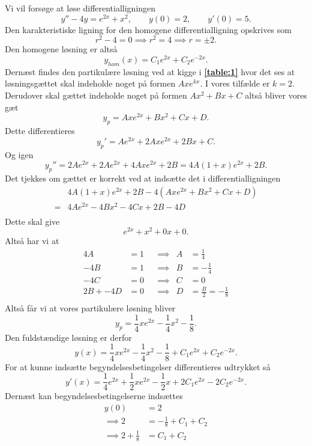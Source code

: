 \begin{eks}
  Vi vil forsøge at løse differentialligningen
  \[
  y'' -4y = e^{2x} + x^2, \qquad y(0) = 2, \qquad y'(0) = 5
  .\]
  Den karakteristiske ligning for den homogene differentialligning opskrives som
  \[
  r^2 - 4 = 0 \implies r^2 = 4 \implies r = \pm 2
  .\]
  Den homogene løsning er altså
  \[
  y_{hom}(x) = C_1e^{2x} + C_2e^{-2x} 
  .\]
  Dernæst findes den partikulære løsning ved at kigge i \textbf{\autoref{table:1}} hvor det ses at løsningsgættet skal indeholde noget på formen $Axe^{kx}$. I vores tilfælde er $k=2$. Derudover skal gættet indeholde noget på formen $Ax^2+Bx+C$ altså bliver vores gæt
  \[
  y_p = Axe^{2x} + Bx^2 + Cx + D 
  .\]
  Dette differentieres
  \[
  y_p' = Ae^{2x} + 2Axe^{2x} + 2Bx + C
  .\]
  Og igen
  \[
  y_p'' = 2Ae^{2x} + 2Ae^{2x} + 4Axe^{2x} + 2B  = 4A\left( 1+x \right)e^{2x} + 2B 
  .\]
  Det tjekkes om gættet er korrekt ved at indsætte det i differentialligningen
  \begin{align*}
  &4A(1+x)e^{2x} + 2B - 4\left( Axe^{2x} + Bx^2 + Cx + D \right) \\
  =& 4Ae^{2x} - 4Bx^2 - 4Cx + 2B - 4D \\
  \end{align*}
  Dette skal give
  \[
  e^{2x} + x^2 + 0x + 0
  .\]
  Altså har vi at
  \begin{align*}
  4A &= 1 & &\implies & A &= \frac{1}{4}\\
  -4B &= 1 & &\implies & B &= -\frac{1}{4}\\
  -4C &= 0 & &\implies & C&=0 \\
  2B + -4D &= 0 & &\implies & D &= \frac{B}{2} = -\frac{1}{8} \\
  \end{align*}
  Altså får vi at vores partikulære løsning bliver
  \[
  y_p = \frac{1}{4}xe^{2x} - \frac{1}{4}x^2 - \frac{1}{8} 
  .\]
  Den fuldstændige løsning er derfor
  \[
  y(x) = \frac{1}{4}xe^{2x} - \frac{1}{4}x^2 - \frac{1}{8} + C_1e^{2x} + C_2e^{-2x}  
  .\]
  For at kunne indsætte begyndelsesbetingelser differentieres udtrykket så
  \[
    y'(x) = \frac{1}{4}e^{2x} + \frac{1}{2}xe^{2x} - \frac{1}{2}x + 2C_1e^{2x} -2C_2e^{-2x}
  .\]
  Dernæst kan begyndelsesbetingelserne indsættes
  \begin{align*}
    y(0) &= 2 \\
    \implies 2 &= -\frac{1}{8} + C_1 + C_2 \\
    \implies 2 + \frac{1}{8} &= C_1 + C_2
  \end{align*}

\end{eks}
